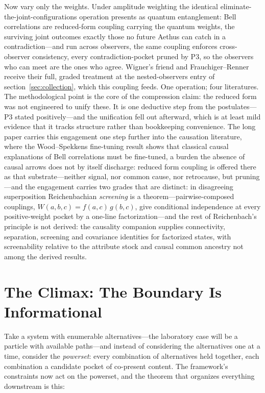 \documentclass[11pt]{article}
\theoremstyle{definition}
\newcommand{\Aethus}{Aethus}
\begin{document}
Now vary only the weights. Under amplitude weighting the identical eliminate-the-joint-configurations operation presents as quantum entanglement: Bell correlations are reduced-form coupling carrying the quantum weights, the surviving joint outcomes exactly those no future \Aethus{} can catch in a contradiction---and run across observers, the same coupling enforces cross-observer consistency, every contradiction-pocket pruned by P3, so the observers who can meet are the ones who agree. Wigner's friend and Frauchiger--Renner receive their full, graded treatment at the nested-observers entry of section~\ref{sec:collection}, which this coupling feeds. One operation; four literatures. The methodological point is the core of the compression claim: the reduced form was not engineered to unify these. It is one deductive step from the postulates---P3 stated positively---and the unification fell out afterward, which is at least mild evidence that it tracks structure rather than bookkeeping convenience. The long paper carries this engagement one step further into the causation literature, where the Wood--Spekkens fine-tuning result shows that classical causal explanations of Bell correlations must be fine-tuned, a burden the absence of causal arrows does not by itself discharge: reduced form coupling is offered there as that substrate---neither signal, nor common cause, nor retrocause, but pruning---and the engagement carries two grades that are distinct: in disagreeing superposition Reichenbachian \emph{screening} is a theorem---pairwise-composed couplings, $W(a,b,c) = f(a,c)\,g(b,c)$, give conditional independence at every positive-weight pocket by a one-line factorization---and the rest of Reichenbach's principle is not derived: the causality companion supplies connectivity, separation, screening and covariance identities for factorized states, with screenability relative to the attribute stock and causal common ancestry not among the derived results.

\section{The Climax: The Boundary Is Informational}\label{sec:powerset}

Take a system with enumerable alternatives---the laboratory case will be a particle with available paths---and instead of considering the alternatives one at a time, consider the \emph{powerset}: every combination of alternatives held together, each combination a candidate pocket of co-present content. The framework's constraints now act on the powerset, and the theorem that organizes everything downstream is this:
\end{document}
